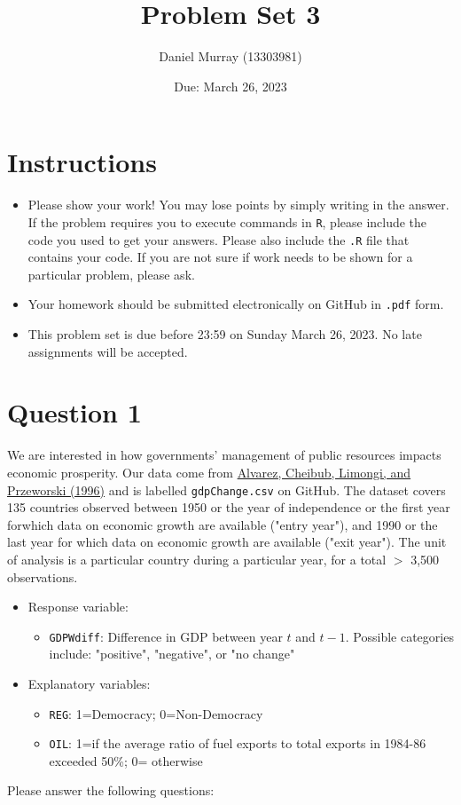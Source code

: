 \documentclass[12pt,letterpaper]{article}
\title{Problem Set 3}
\date{Due: March 26, 2023}
\author{Daniel Murray (13303981)}
\begin{document}
	\maketitle
	\section*{Instructions}
	\begin{itemize}
	\item Please show your work! You may lose points by simply writing in the answer. If the problem requires you to execute commands in \texttt{R}, please include the code you used to get your answers. Please also include the \texttt{.R} file that contains your code. If you are not sure if work needs to be shown for a particular problem, please ask.
\item Your homework should be submitted electronically on GitHub in \texttt{.pdf} form.
\item This problem set is due before 23:59 on Sunday March 26, 2023. No late assignments will be accepted.
	\end{itemize}

	\vspace{.25cm}
\section*{Question 1}
\vspace{.25cm}
\noindent We are interested in how governments' management of public resources impacts economic prosperity. Our data come from \href{https://www.researchgate.net/profile/Adam_Przeworski/publication/240357392_Classifying_Political_Regimes/links/0deec532194849aefa000000/Classifying-Political-Regimes.pdf}{Alvarez, Cheibub, Limongi, and Przeworski (1996)} and is labelled \texttt{gdpChange.csv} on GitHub. The dataset covers 135 countries observed between 1950 or the year of independence or the first year forwhich data on economic growth are available ("entry year"), and 1990 or the last year for which data on economic growth are available ("exit year"). The unit of analysis is a particular country during a particular year, for a total $>$ 3,500 observations. 

\begin{itemize}
	\item
	Response variable: 
	\begin{itemize}
		\item \texttt{GDPWdiff}: Difference in GDP between year $t$ and $t-1$. Possible categories include: "positive", "negative", or "no change"
	\end{itemize}
	\item
	Explanatory variables: 
	\begin{itemize}
		\item
		\texttt{REG}: 1=Democracy; 0=Non-Democracy
		\item
		\texttt{OIL}: 1=if the average ratio of fuel exports to total exports in 1984-86 exceeded 50\%; 0= otherwise
	\end{itemize}
	
\end{itemize}
\newpage
\noindent Please answer the following questions:
\end{document}
